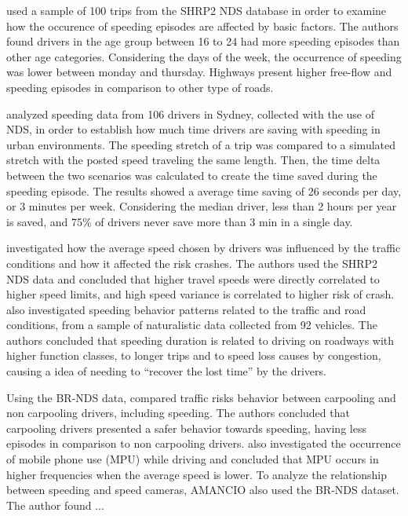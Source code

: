 \textcite{Richard2020} used a sample of 100 trips from the SHRP2 NDS database in order to examine how the occurence of speeding episodes are affected by basic factors. The authors found drivers in the age group between 16 to 24 had more speeding episodes than other age categories. Considering the days of the week, the occurrence of speeding was lower between monday and thursday. Highways present higher free-flow and speeding episodes in comparison to other type of roads. 

\textcite{Ellison2015} analyzed speeding data from 106 drivers in Sydney, collected with the use of NDS, in order to establish how much time drivers are saving with speeding in urban environments. The speeding stretch of a trip was compared to a simulated stretch with the posted speed traveling the same length. Then, the time delta between the two scenarios was calculated to create the time saved during the speeding episode. The results showed a average time saving of 26 seconds per day, or 3 minutes per week. Considering the median driver, less than 2 hours per year is saved, and 75\% of drivers never save more than 3 min in a single day. 

\textcite{Hamzeie2017} investigated how the average speed chosen by drivers was influenced by the traffic conditions and how it affected the risk crashes. The authors used the SHRP2 NDS data and concluded that higher travel speeds were directly correlated to higher speed limits, and high speed variance is correlated to higher risk of crash. \textcite{Kong2020} also investigated speeding behavior patterns related to the traffic and road conditions, from a sample of naturalistic data collected from 92 vehicles. The authors concluded that speeding duration is related to driving on roadways with higher function classes, to longer trips and to speed loss causes by congestion, causing a idea of needing to ``recover the lost time'' by the drivers.


Using the BR-NDS data, \textcite{Bastos2021} compared traffic risks behavior between carpooling and non carpooling drivers, including speeding. The authors concluded that carpooling drivers presented a safer behavior towards speeding, having less episodes in comparison to non carpooling drivers. \textcite{Bastos2020a} also investigated the occurrence of mobile phone use (MPU) while driving and concluded that MPU occurs in higher frequencies when the average speed is lower. To analyze the relationship between speeding and speed cameras, AMANCIO also used the BR-NDS dataset. The author found ...

